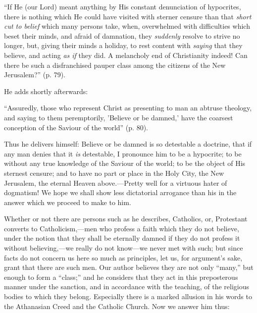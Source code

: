 ``If He (our Lord) meant anything by His constant
denunciation of hypocrites, there is nothing which He could have
visited with sterner censure than that \emph{short cut to belief}
which many persons take, when, overwhelmed with difficulties which
beset their minds, and afraid of damnation, they \emph{suddenly}
resolve to strive no longer, but, giving their minds a holiday, to
rest content with \emph{saying} that they believe, and acting \emph{as if}
they did. A melancholy end of Christianity indeed! Can there be such a
disfranchised pauper class among the citizens of the New Jerusalem?''
(p. 79).

He adds shortly afterwards:

``Assuredly, those who represent Christ as
presenting to man an abtruse theology, and saying to them
peremptorily, 'Believe or be damned,' have the coarsest conception of
the Saviour of the world'' (p. 80).

Thus he delivers himself: Believe or be damned is
so detestable a doctrine, that if any man denies that it \emph{is}
detestable, I pronounce him to be a hypocrite; to be without any true
knowledge of the Saviour of the world; to be the object of His
sternest censure; and to have no part or place in the Holy City, the
New Jerusalem, the eternal Heaven above.—Pretty well for a virtuous
hater of dogmatism! We hope we shall show less dictatorial arrogance
than his in the answer which we proceed to make to him.

Whether or not there are persons such as he
describes, Catholics, or, Protestant converts to Catholicism,—men
who profess a faith which they do not believe, under the notion that
they shall be eternally damned if they do not profess it without
believing,—we really do not know—we never met with such; but since
facts do not concern us here so much as principles, let us, for
argument's sake, grant that there are such men. Our author believes
they are not only ``many,'' but enough to form a ``class;'' and he
considers that they act in this preposterous manner under the
sanction, and in accordance with the teaching, of the religious bodies
to which they belong. Especially there is a marked allusion in his
words to the Athanasian Creed and the Catholic Church. Now we answer
him thus:

